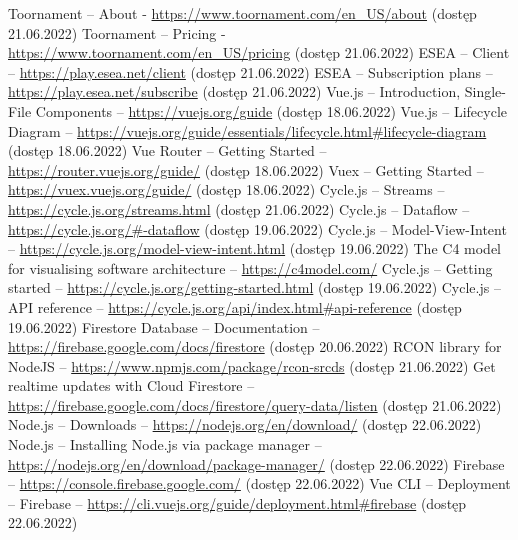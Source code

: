 \documentclass[shortabstract]{iithesis}
\theoremstyle{definition} \newtheorem{definition}{Definicja}[]
\theoremstyle{remark} \newtheorem{remark}[definition]{Observation}
\theoremstyle{plain} \newtheorem{theorem}[definition]{Theorem}
\theoremstyle{plain} \newtheorem{lemma}[definition]{Lemma}
\begin{document}
\begin{thebibliography}{1}
     Toornament -- About - \url{https://www.toornament.com/en_US/about} (dostęp 21.06.2022)
     Toornament -- Pricing - \url{https://www.toornament.com/en_US/pricing} (dostęp 21.06.2022)
     ESEA -- Client -- \url{https://play.esea.net/client} (dostęp 21.06.2022)
     ESEA -- Subscription plans -- \url{https://play.esea.net/subscribe} (dostęp 21.06.2022)
     Vue.js -- Introduction, Single-File Components -- \url{https://vuejs.org/guide} (dostęp 18.06.2022)
     Vue.js -- Lifecycle Diagram -- \url{https://vuejs.org/guide/essentials/lifecycle.html#lifecycle-diagram} (dostęp 18.06.2022)
     Vue Router -- Getting Started -- \url{https://router.vuejs.org/guide/} (dostęp 18.06.2022)
     Vuex -- Getting Started -- \url{https://vuex.vuejs.org/guide/} (dostęp 18.06.2022)
     Cycle.js -- Streams -- \url{https://cycle.js.org/streams.html} (dostęp 21.06.2022)
     Cycle.js -- Dataflow -- \url{https://cycle.js.org/#-dataflow} (dostęp 19.06.2022)
     Cycle.js -- Model-View-Intent -- \url{https://cycle.js.org/model-view-intent.html} (dostęp 19.06.2022)
     The C4 model for visualising software architecture -- \url{https://c4model.com/}
     Cycle.js -- Getting started -- \url{https://cycle.js.org/getting-started.html} (dostęp 19.06.2022)
     Cycle.js -- API reference -- \url{https://cycle.js.org/api/index.html#api-reference} (dostęp 19.06.2022)
     Firestore Database -- Documentation -- \url{https://firebase.google.com/docs/firestore} (dostęp 20.06.2022)
     RCON library for NodeJS -- \url{https://www.npmjs.com/package/rcon-srcds} (dostęp 21.06.2022)
     Get realtime updates with Cloud Firestore -- \url{https://firebase.google.com/docs/firestore/query-data/listen} (dostęp 21.06.2022)
     Node.js -- Downloads -- \url{https://nodejs.org/en/download/} (dostęp 22.06.2022)
     Node.js -- Installing Node.js via package manager -- \url{https://nodejs.org/en/download/package-manager/} (dostęp 22.06.2022)
     Firebase -- \url{https://console.firebase.google.com/} (dostęp 22.06.2022)
     Vue CLI -- Deployment -- Firebase -- \url{https://cli.vuejs.org/guide/deployment.html#firebase} (dostęp 22.06.2022)
\end{thebibliography}
\end{document}
